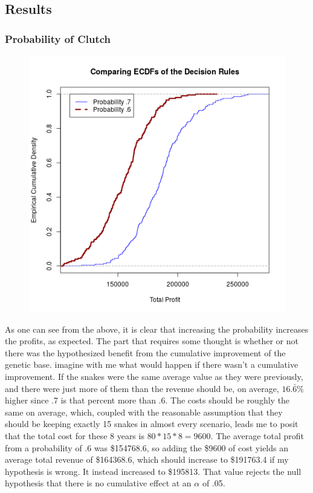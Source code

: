 \documentclass{article}
\begin{document}
		\subsection*{Results}
		\subsubsection*{Probability of Clutch}
		\begin{figure}[H]
		\centering
		\includegraphics[width=.5\textwidth]{probECDF.png}
		\end{figure}
		As one can see from the above, it is clear that increasing the probability increases the profits, as expected. The part that requires some thought is whether or not there was the hypothesized benefit from the cumulative improvement of the genetic base. imagine with me what would happen if there wasn't a cumulative improvement. If the snakes were the same average value as they were previously, and there were just more of them than the revenue should be, on average, $16.\bar{6}\%$ higher since .7 is that percent more than .6. The costs should be roughly the same on average, which, coupled with the reasonable assumption that they should be keeping exactly 15 snakes in almost every scenario, leads me to posit that the total cost for these 8 years is $80*15*8 = 9600$. The average total profit from a probability of .6 was \$154768.6, so adding the \$9600 of cost yields an average total revenue of \$164368.6, which should increase to \$191763.4 if my hypothesis is wrong. It instead increased to \$195813. That value rejects the null hypothesis that there is no cumulative effect at an $\alpha$ of .05.
\end{document}

